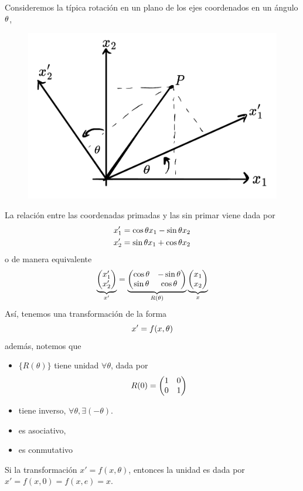 \begin{ej}
Consideremos la típica rotación en un plano de los ejes coordenados en un ángulo $\theta$,
	\begin{figure}[h!]
		\centering
		\includegraphics[scale=0.5]{fig/sistema-coord.pdf}
	\end{figure}
La relación entre las coordenadas primadas y las sin primar viene dada por
\begin{align}
  x'_1&=\cos\theta x_1-\sin\theta x_2\\
  x'_2&=\sin\theta x_1+\cos\theta x_2
\end{align}
o de manera equivalente
\begin{equation}
  \underbrace{\mqty(x_1'\\x'_2)}_{x'}=\underbrace{\mqty(\cos\th&-\sin\th\\\sin\th&\cos\th)}_{R(\th)}\underbrace{\mqty(x_1\\x_2)}_{x}
\end{equation}
Así, tenemos una transformación de la forma 
\begin{equation}
  x'=f(x,\theta )
\end{equation}
además, notemos que 
\begin{itemize}
\item $\{R(\theta)\}$ tiene unidad $\forall \theta$, dada por
\begin{equation}
  R(0)=\mqty(1&0\\0&1)
\end{equation}
\item tiene inverso, $\forall\theta, \exists (-\theta)$.
\item es asociativo,
\item es conmutativo
\end{itemize}
Si la transformación $x'=f(x,\theta)$, entonces la unidad es dada por $x'=f(x,0)=f(x,e)=x$.
\end{ej}

